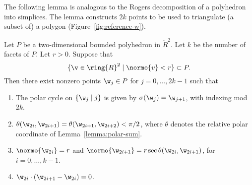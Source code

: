 The following lemma is analogous to the Rogers decomposition of a
polyhedron into simplices.  The lemma constructs $2k$ points to be
used to triangulate (a subset of) a polygon (Figure~\ref{fig:reference-w}).


\begin{lemma}[]\label{lemma:2D-poly}
Let $P$ be a two-dimensional bounded polyhedron in $\ring{R}^2$.
Let $k$ be the number of facets of $P$.  Let $r>0$.  Suppose that
\[
\{\v\in \ring{R}^2\mid  \normo{v}< r\} \subset P.
\]
Then there exist nonzero points $\w_j\in P$
for $j=0,\ldots,2 k-1$ such that
\begin{enumerate}
\item The polar cycle on  $\{\w_j\mid j\}$ is given by
$\sigma(\w_j) = \w_{j+1}$, with indexing mod $2k$.
\item $\theta(\w_{2i},\w_{2i+1}) = \theta(\w_{2i+1},\w_{2i+2}) < \pi/2$,  
where $\theta$ denotes the
relative polar coordinate of Lemma~\ref{lemma:polar-sum}.
\item $\normo{\w_{2i}}=r$ and 
$\normo{\w_{2i+1}} = r\sec \theta(\w_{2i},\w_{2i+1})$, 
for $i=0,\ldots,k-1$.
\item $\w_{2i}\cdot (\w_{2i+1}-\w_{2i}) = 0$.
\end{enumerate}
\end{lemma}

\figYAHDBVO %

